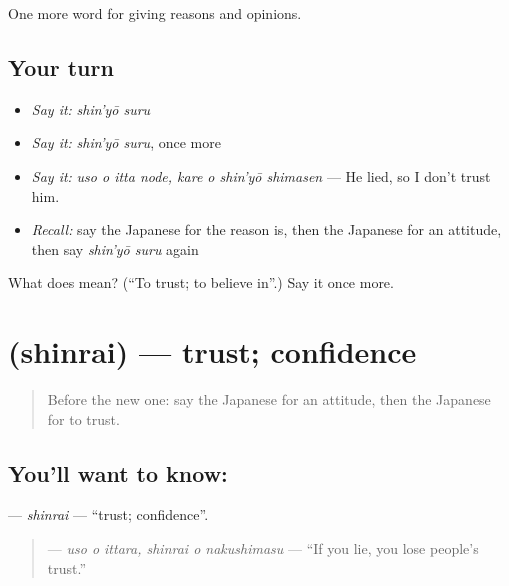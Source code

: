 \begin{grammarlens}[title={What you've built}]
One more word for giving reasons and opinions.
\end{grammarlens}

\subsection*{Your turn}
\begin{itemize}
\raggedright
  \item \emph{Say it:} \emph{shin'yō suru}
  \item \emph{Say it:} \emph{shin'yō suru}, once more
  \item \emph{Say it:} \emph{uso o itta node, kare o shin'yō shimasen} — He lied, so I don't trust him.
  \item \emph{Recall:} say the Japanese for the reason is, then the Japanese for an attitude, then say \emph{shin'yō suru} again
\end{itemize}

\begin{tcolorbox}[breakable,colback=teal!4,colframe=teal!35!black,title={Before you move on}]
What does  mean? (\textquotedblleft{}To trust; to believe in\textquotedblright{}.) Say it once more.
\end{tcolorbox}
\section[\texorpdfstring{\ja{しんらい} (shinrai)}{しんらい (shinrai)}]{ (shinrai) — trust; confidence}

\label{lesson:JA-C343-shinrai}



\begin{quote}
Before the new one: say the Japanese for an attitude, then the Japanese for to trust.
\end{quote}

\subsection*{You'll want to know: }
\textbf{} — \emph{shinrai} — \textquotedblleft{}trust; confidence\textquotedblright{}.

\begin{quote}
\textbf{  } — \emph{uso o ittara, shinrai o nakushimasu} — \textquotedblleft{}If you lie, you lose people's trust.\textquotedblright{}
\end{quote}


